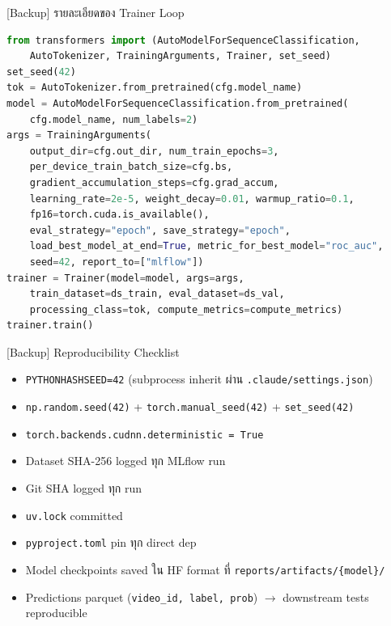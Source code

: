 \documentclass[aspectratio=169,11pt,xcolor=dvipsnames]{beamer}
\begin{document}
\appendix

\begin{frame}[fragile]{[Backup] รายละเอียดของ Trainer Loop}
  \scriptsize
  \begin{lstlisting}[language=Python,basicstyle=\ttfamily\tiny]
from transformers import (AutoModelForSequenceClassification,
    AutoTokenizer, TrainingArguments, Trainer, set_seed)
set_seed(42)
tok = AutoTokenizer.from_pretrained(cfg.model_name)
model = AutoModelForSequenceClassification.from_pretrained(
    cfg.model_name, num_labels=2)
args = TrainingArguments(
    output_dir=cfg.out_dir, num_train_epochs=3,
    per_device_train_batch_size=cfg.bs,
    gradient_accumulation_steps=cfg.grad_accum,
    learning_rate=2e-5, weight_decay=0.01, warmup_ratio=0.1,
    fp16=torch.cuda.is_available(),
    eval_strategy="epoch", save_strategy="epoch",
    load_best_model_at_end=True, metric_for_best_model="roc_auc",
    seed=42, report_to=["mlflow"])
trainer = Trainer(model=model, args=args,
    train_dataset=ds_train, eval_dataset=ds_val,
    processing_class=tok, compute_metrics=compute_metrics)
trainer.train()
  \end{lstlisting}
\end{frame}

\begin{frame}{[Backup] Reproducibility Checklist}
  \begin{itemize}
    \item \texttt{PYTHONHASHSEED=42} (subprocess inherit ผ่าน \texttt{.claude/settings.json})
    \item \texttt{np.random.seed(42)} + \texttt{torch.manual\_seed(42)} + \texttt{set\_seed(42)}
    \item \texttt{torch.backends.cudnn.deterministic = True}
    \item Dataset SHA-256 logged ทุก MLflow run
    \item Git SHA logged ทุก run
    \item \texttt{uv.lock} committed
    \item \texttt{pyproject.toml} pin ทุก direct dep
    \item Model checkpoints saved ใน HF format ที่ \texttt{reports/artifacts/\{model\}/}
    \item Predictions parquet (\texttt{video\_id, label, prob}) $\rightarrow$ downstream tests reproducible
  \end{itemize}
\end{frame}
\end{document}
